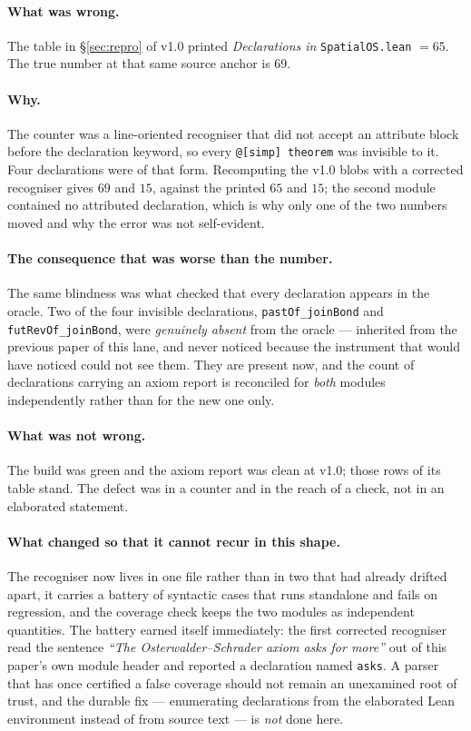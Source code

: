 \documentclass[11pt]{article}
\theoremstyle{definition}
\begin{document}
\paragraph{What was wrong.}  The table in \S\ref{sec:repro} of v1.0 printed
\emph{Declarations in} \texttt{SpatialOS.lean} $=65$.  The true number at that
same source anchor is $69$.

\paragraph{Why.}  The counter was a line-oriented recogniser that did not accept
an attribute block before the declaration keyword, so every
\verb|@[simp] theorem| was invisible to it.  Four declarations were of that
form.  Recomputing the v1.0 blobs with a corrected recogniser gives $69$ and
$15$, against the printed $65$ and $15$; the second module contained no
attributed declaration, which is why only one of the two numbers moved and why
the error was not self-evident.

\paragraph{The consequence that was worse than the number.}  The same blindness
was what checked that every declaration appears in the oracle.  Two of the four
invisible declarations, \verb|pastOf_joinBond| and \verb|futRevOf_joinBond|,
were \emph{genuinely absent} from the oracle --- inherited from the previous
paper of this lane, and never noticed because the instrument that would have
noticed could not see them.  They are present now, and the count of declarations
carrying an axiom report is reconciled for \emph{both} modules independently
rather than for the new one only.

\paragraph{What was not wrong.}  The build was green and the axiom report was
clean at v1.0; those rows of its table stand.  The defect was in a counter and
in the reach of a check, not in an elaborated statement.

\paragraph{What changed so that it cannot recur in this shape.}  The recogniser
now lives in one file rather than in two that had already drifted apart, it
carries a battery of syntactic cases that runs standalone and fails on
regression, and the coverage check keeps the two modules as independent
quantities.  The battery earned itself immediately: the first corrected
recogniser read the sentence \emph{``The Osterwalder--Schrader axiom asks for
more''} out of this paper's own module header and reported a declaration named
\texttt{asks}.  A parser that has once certified a false coverage should not
remain an unexamined root of trust, and the durable fix --- enumerating
declarations from the elaborated Lean environment instead of from source text
--- is \emph{not} done here.
\end{document}
